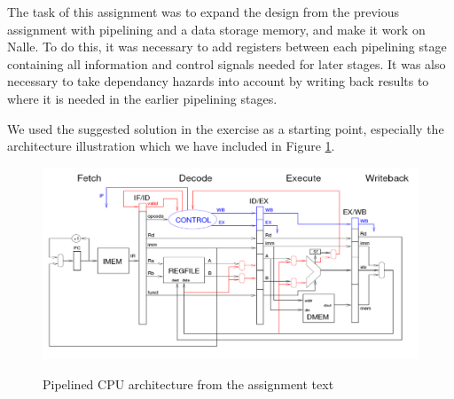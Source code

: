 \documentclass[11pt]{report}
\begin{document}
The task of this assignment was to expand the design from the previous
assignment with pipelining and a data storage memory, and make it work
on Nalle. To do this, it
was necessary to add registers between each pipelining stage containing
all information and control signals needed for later stages. It was also
necessary to take dependancy hazards into account by writing back results
to where it is needed in the earlier pipelining stages. 

We used the suggested solution in the exercise as a starting point, 
especially the architecture illustration which we have included in 
Figure \ref{fig:architecture}.

\begin{figure}[htbp]
  \centering
  \includegraphics[width=.95\linewidth]{toplevel.png} \\
  \caption{Pipelined CPU architecture from the assignment text}
  \label{fig:architecture}
\end{figure}


\end{document}
